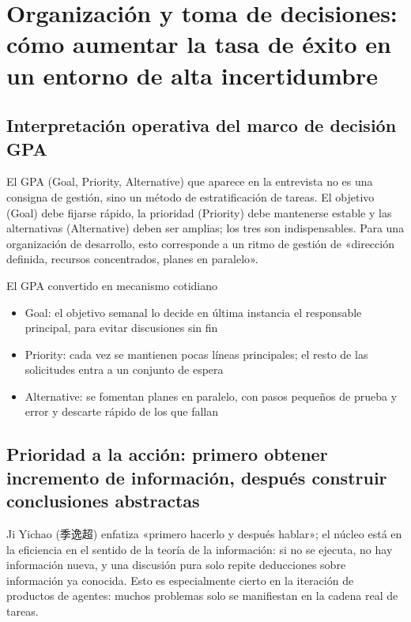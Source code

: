 \section{Organización y toma de decisiones: cómo aumentar la tasa de éxito en un entorno de alta incertidumbre}

\subsection{Interpretación operativa del marco de decisión GPA}

El GPA (Goal, Priority, Alternative) que aparece en la entrevista no es una consigna de gestión, sino un método de estratificación de tareas. El objetivo (Goal) debe fijarse rápido, la prioridad (Priority) debe mantenerse estable y las alternativas (Alternative) deben ser amplias; los tres son indispensables. Para una organización de desarrollo, esto corresponde a un ritmo de gestión de «dirección definida, recursos concentrados, planes en paralelo».

\begin{importantbox}{El GPA convertido en mecanismo cotidiano}
\begin{itemize}
    \item Goal: el objetivo semanal lo decide en última instancia el responsable principal, para evitar discusiones sin fin
    \item Priority: cada vez se mantienen pocas líneas principales; el resto de las solicitudes entra a un conjunto de espera
    \item Alternative: se fomentan planes en paralelo, con pasos pequeños de prueba y error y descarte rápido de los que fallan
\end{itemize}
\end{importantbox}

\subsection{Prioridad a la acción: primero obtener incremento de información, después construir conclusiones abstractas}

Ji Yichao (季逸超) enfatiza «primero hacerlo y después hablar»; el núcleo está en la eficiencia en el sentido de la teoría de la información: si no se ejecuta, no hay información nueva, y una discusión pura solo repite deducciones sobre información ya conocida. Esto es especialmente cierto en la iteración de productos de agentes: muchos problemas solo se manifiestan en la cadena real de tareas.

